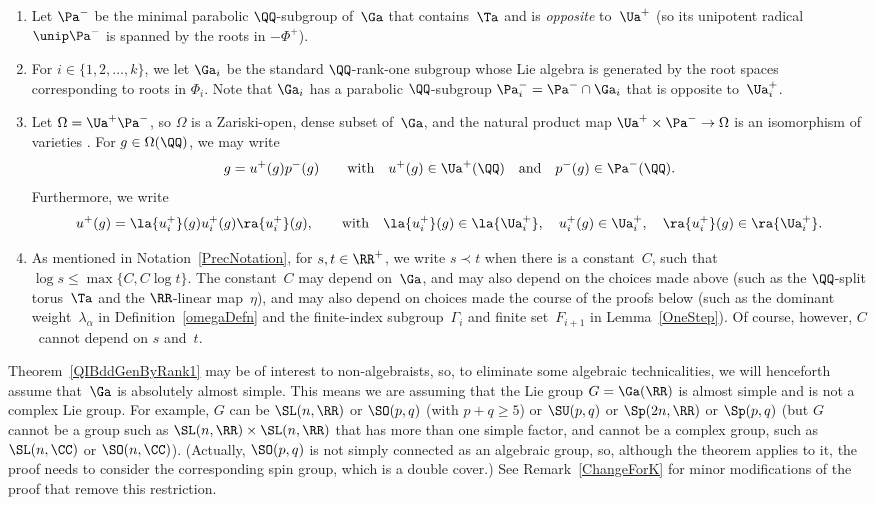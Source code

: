 \begin{notation}
\begin{enumerate}
\item Let $\Pa^-$ be the minimal parabolic $\QQ$-subgroup of~$\Ga$ that contains~$\Ta$ and is \emph{opposite} to~$\Ua^+$ (so its unipotent radical $\unip \Pa^-$ is spanned by the roots in $-\Phi^+$).

\item For $i \in \{1,2,\ldots,k\}$, we let $\Ga_i$ be the standard $\QQ$-rank-one subgroup whose Lie algebra is generated by the root spaces corresponding to roots in $\Phi_i$. Note that $\Ga_i$ has a parabolic $\QQ$-subgroup $\Pa_i^- = \Pa^- \cap \Ga_i$ that is opposite to~$\Ua_i^+$.

\item Let $\Omega = \Ua^+ \Pa^-$, so $\Omega$ is a Zariski-open, dense subset of~$\Ga$, and the natural product map $\Ua^+ \times \Pa^- \to \Omega$ is an isomorphism of varieties \cite[Proposition~4.10(d), pp.~88--89]{BorelTits-GrpRed}. For $g \in \Omega(\QQ)$, we may write
		\[ g = u^+(g) p^-(g) \qquad \text{with} \quad u^+(g) \in \Ua^+(\QQ) \quad \text{and} \quad p^-(g) \in \Pa^-(\QQ) . \]
Furthermore, we write
	\[ u^+(g) = \la{u^+_i}(g) u^+_i(g) \ra{u^+_i}(g) , \qquad \text{with} \quad \la{u^+_i}(g) \in \la{\Ua_i^+}, \quad u^+_i(g) \in \Ua_i^+, \quad \ra{u^+_i}(g) \in \ra{\Ua_i^+} .\]
	
	\item As mentioned in Notation~\ref{PrecNotation}, for $s,t \in \RR^+$, we write $s \prec t$ when there is a constant~$C$, such that $\log s \le \max\{C, C \log t\}$. The constant~$C$ may depend on~$\Ga$, and may also depend on the choices made above (such as the $\QQ$-split torus~$\Ta$ and the $\RR$-linear map~$\eta$), and may also depend on choices made the course of the proofs below (such as the dominant weight~$\lambda_\alpha$ in Definition~\ref{omegaDefn} and the finite-index subgroup~$\Gamma_i$ and finite set~$F_{i+1}$ in Lemma~\ref{OneStep}). Of course, however, $C$~cannot depend on $s$ and~$t$.
\end{enumerate}
\end{notation}

\begin{assumption} \label{AbsSimple}Theorem~\ref{QIBddGenByRank1} may be of interest to non-algebraists, so, to eliminate some algebraic technicalities, we will henceforth assume that~$\Ga$ is absolutely almost simple. This means we are assuming that the Lie group $G = \Ga(\RR)$ is almost simple and is not a complex Lie group. For example, $G$ can be $\SL(n,\RR)$ or $\SO(p,q)$ (with $p + q \ge 5$) or $\SU(p,q)$ or $\Sp(2n,\RR)$ or $\Sp(p,q)$ (but $G$ cannot be a group such as $\SL(n,\RR) \times \SL(n,\RR)$ that has more than one simple factor, and cannot be a complex group, such as $\SL(n,\CC)$ or $\SO(n,\CC)$).
(Actually, $\SO(p,q)$ is not simply connected as an algebraic group, so, although the theorem applies to it, the proof needs to consider the corresponding spin group, which is a double cover.)
See Remark~\ref{ChangeForK} for minor modifications of the proof that remove this restriction.
\end{assumption}

